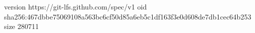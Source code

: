 version https://git-lfs.github.com/spec/v1
oid sha256:467dbbe75069108a563bc6cf50d85a6eb5c1df163f3e0d608de7db1cec64b253
size 280711
